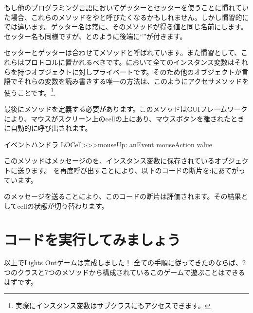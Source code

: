 \documentclass[a4paper,10pt,twoside]{book}
\begin{document}
もし他のプログラミング言語においてゲッターとセッターを使うことに慣れていた場合、これらのメソッドをやと呼びたくなるかもしれません。しかし慣習的に\st{}では違います。ゲッター名は常に、そのメソッドが得る値と同じ名前にします。セッター名も同様ですが、とのように後端に``\ct{:}''が付きます。

セッターとゲッターは合わせてメソッドと呼ばれています。また慣習として、これらはプロトコルに置かれるべきです。\st{}において全てのインスタンス変数はそれらを持つオブジェクトに対しプライベートです。そのため他のオブジェクトが\st{}言語でそれらの変数を読み書きする唯一の方法は、このようにアクセサメソッドを使うことです。\footnote{実際にインスタンス変数はサブクラスにもアクセスできます。
}.


最後にメソッドを定義する必要があります。このメソッドはGUIフレームワークにより、マウスがスクリーン上のcellの上にあり、マウスボタンを離されたときに自動的に呼び出されます。

\begin{method}[sbecellmouseup]{イベントハンドラ}
LOCell>>>mouseUp: anEvent
   mouseAction value
\end{method}


このメソッドはメッセージのを、インスタンス変数に保存されているオブジェクトに送ります。 を再度呼び出すことにより、以下のコードの断片を:にあてがっています。


\noindent
{}のメッセージを送ることにより、このコードの断片は評価されます。その結果としてcellの状態が切り替わります。

\section{コードを実行してみましょう}

以上でLights Outゲームは完成しました！
全ての手順に従ってきたのならば、2つのクラスと7つのメソッドから構成されているこのゲームで遊ぶことはできるはずです。
\end{document}
